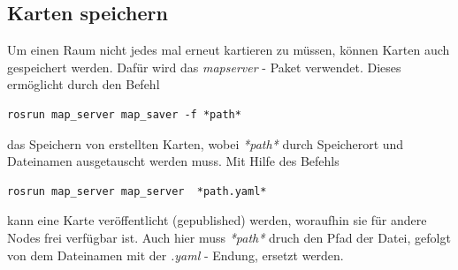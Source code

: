 {{	}	

	\subsection{Karten speichern}
	{
		Um einen Raum nicht jedes mal erneut kartieren zu müssen, können Karten auch gespeichert werden. Dafür wird das \emph{map\tus server} - Paket verwendet. Dieses ermöglicht durch den Befehl 
		\begin{lstlisting}
rosrun map_server map_saver -f *path*
		\end{lstlisting}
	das Speichern von erstellten Karten, wobei \emph{*path*} durch Speicherort und Dateinamen ausgetauscht werden muss. Mit Hilfe des Befehls
		\begin{lstlisting}
rosrun map_server map_server  *path.yaml*
		\end{lstlisting}
	kann eine Karte veröffentlicht (gepublished) werden, woraufhin sie für andere Nodes frei verfügbar ist. Auch hier muss \emph{*path*} druch den Pfad der Datei, gefolgt von dem Dateinamen mit der \emph{.yaml} - Endung, ersetzt werden.
	}
}